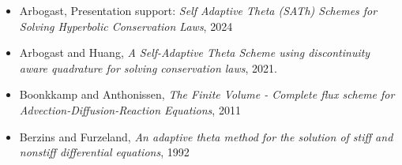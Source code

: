 \documentclass[12pt]{article}
\begin{document}
\begin{itemize}
    \item Arbogast, Presentation support: \textit{Self Adaptive Theta (SATh) Schemes for Solving Hyperbolic Conservation Laws}, 2024
    \item Arbogast and Huang, \textit{A Self-Adaptive Theta Scheme using discontinuity aware quadrature for solving conservation laws}, 2021.
    \item Boonkkamp and Anthonissen, \textit{The Finite Volume - Complete flux scheme for Advection-Diffusion-Reaction Equations}, 2011
    \item Berzins and Furzeland, \textit{An adaptive theta method for the solution of stiff and nonstiff differential equations}, 1992
\end{itemize}
\end{document}
